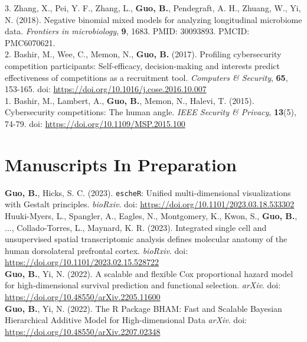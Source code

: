 3. Zhang, X., Pei, Y. F., Zhang, L., {\bf Guo, B.}, Pendegraft, A. H., Zhuang, W., Yi, N. (2018). Negative binomial mixed models for analyzing longitudinal microbiome data. {\it Frontiers in microbiology}, {\bf 9}, 1683. PMID: 30093893. PMCID: PMC6070621.\\

2. Bashir, M., Wee, C., Memon, N., {\bf Guo, B.} (2017). Profiling cybersecurity competition participants: Self-efficacy, decision-making and interests predict effectiveness of competitions as a recruitment tool. {\it Computers \& Security}, {\bf 65}, 153-165. doi: \url{https://doi.org/10.1016/j.cose.2016.10.007}\\

1. Bashir, M., Lambert, A., {\bf Guo, B.}, Memon, N., Halevi, T. (2015). Cybersecurity competitions: The human angle. {\it IEEE Security \& Privacy}, {\bf 13}(5), 74-79. doi: \url{https://doi.org/10.1109/MSP.2015.100}\\

\section{Manuscripts In Preparation}

\vspace{-3ex}

\textbf{Guo, B.}, Hicks, S. C. (2023). \texttt{escheR}: Unified multi-dimensional visualizations with Gestalt principles. {\it bioRxiv}. doi: \url{https://doi.org/10.1101/2023.03.18.533302}\\

Huuki-Myers, L., Spangler, A., Eagles, N., Montgomery, K., Kwon, S., \textbf{Guo, B.}, ..., Collado-Torres, L.,  Maynard, K. R. (2023). Integrated single cell and unsupervised spatial transcriptomic analysis defines molecular anatomy of the human dorsolateral prefrontal cortex. {\it bioRxiv}. doi: \url{https://doi.org/10.1101/2023.02.15.528722}\\

\textbf{Guo, B.}, Yi, N. (2022). A scalable and flexible Cox proportional hazard model for high-dimensional survival prediction and functional selection. {\it arXiv}. doi: \url{https://doi.org/10.48550/arXiv.2205.11600}\\

\textbf{Guo, B.}, Yi, N. (2022). The R Package BHAM: Fast and Scalable Bayesian Hierarchical Additive Model for High-dimensional Data  {\it arXiv}. doi: \url{ 	https://doi.org/10.48550/arXiv.2207.02348}\\

